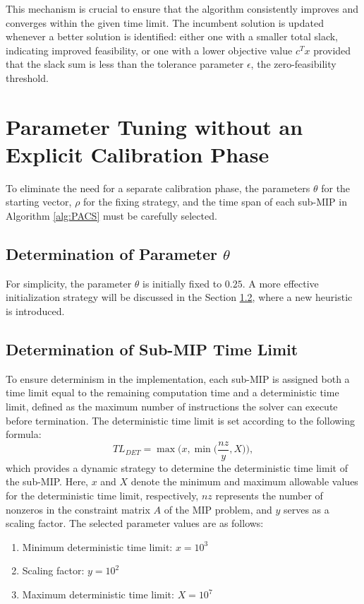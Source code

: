 This mechanism is crucial to ensure that the algorithm consistently improves and converges within the given time limit. The incumbent solution is updated whenever a better solution is identified: either one with a smaller total slack, indicating improved feasibility, or one with a lower objective value $c^T x$ provided that the slack sum is less than the tolerance parameter $\epsilon$, the zero-feasibility threshold.

\section{Parameter Tuning without an Explicit Calibration Phase}
To eliminate the need for a separate calibration phase, the parameters $\theta$ for the starting vector, $\rho$ for the fixing strategy, and the time span of each sub-MIP in Algorithm \ref{alg:PACS} must be carefully selected.  
\subsection{Determination of Parameter $\theta$}
For simplicity, the parameter $\theta$ is initially fixed to $0.25$. A more effective initialization strategy will be discussed in the Section \ref{}, where a new heuristic is introduced.  
\subsection{Determination of Sub-MIP Time Limit}
To ensure determinism in the implementation, each sub-MIP is assigned both a time limit equal to the remaining computation time and a deterministic time limit, defined as the maximum number of instructions the solver can execute before termination.  
The deterministic time limit is set according to the following formula:
$$
TL_{DET} = \max\Big(x, \min\Big(\frac{nz}{y}, X\Big)\Big),
$$
which provides a dynamic strategy to determine the deterministic time limit of the sub-MIP.  
Here, $x$ and $X$ denote the minimum and maximum allowable values for the deterministic time limit, respectively, $nz$ represents the number of nonzeros in the constraint matrix $A$ of the MIP problem, and $y$ serves as a scaling factor. The selected parameter values are as follows:
\begin{enumerate}
\item Minimum deterministic time limit: $x = 10^3$  
\item Scaling factor: $y = 10^2$  
\item Maximum deterministic time limit: $X = 10^7$  
\end{enumerate}
